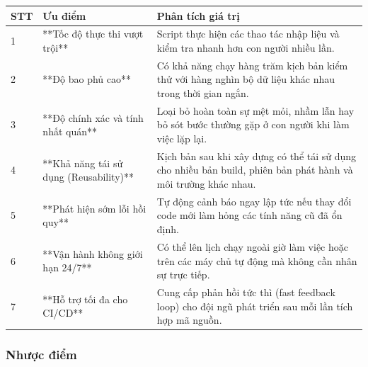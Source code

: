 \begin{table}[H]
\centering
\begin{tabular}{|l|l|l|}
\hline
\textbf{STT} & \textbf{Ưu điểm} & \textbf{Phân tích giá trị} \\ \hline
1 & **Tốc độ thực thi vượt trội** & Script thực hiện các thao tác nhập liệu và kiểm tra nhanh hơn con người nhiều lần. \\ \hline
2 & **Độ bao phủ cao** & Có khả năng chạy hàng trăm kịch bản kiểm thử với hàng nghìn bộ dữ liệu khác nhau trong thời gian ngắn. \\ \hline
3 & **Độ chính xác và tính nhất quán** & Loại bỏ hoàn toàn sự mệt mỏi, nhầm lẫn hay bỏ sót bước thường gặp ở con người khi làm việc lặp lại. \\ \hline
4 & **Khả năng tái sử dụng (Reusability)** & Kịch bản sau khi xây dựng có thể tái sử dụng cho nhiều bản build, phiên bản phát hành và môi trường khác nhau. \\ \hline
5 & **Phát hiện sớm lỗi hồi quy** & Tự động cảnh báo ngay lập tức nếu thay đổi code mới làm hỏng các tính năng cũ đã ổn định. \\ \hline
6 & **Vận hành không giới hạn 24/7** & Có thể lên lịch chạy ngoài giờ làm việc hoặc trên các máy chủ tự động mà không cần nhân sự trực tiếp. \\ \hline
7 & **Hỗ trợ tối đa cho CI/CD** & Cung cấp phản hồi tức thì (fast feedback loop) cho đội ngũ phát triển sau mỗi lần tích hợp mã nguồn. \\ \hline
\end{tabular}
\end{table}




\subsubsection{Nhược điểm}

